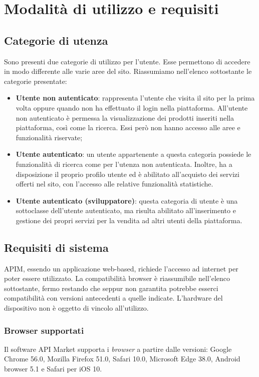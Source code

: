 \newpage
\section{Modalità di utilizzo e requisiti}

\subsection{Categorie di utenza}
Sono presenti due categorie di utilizzo per l'utente. Esse permettono di accedere in modo differente alle varie aree del sito. Riassumiamo nell'elenco sottostante le categorie presentate:

\begin{itemize}
	\item \textbf{Utente non autenticato}: rappresenta l'utente che visita il sito per la prima volta oppure quando non ha effettuato il login nella piattaforma. All'utente non autenticato è permessa la visualizzazione dei prodotti inseriti nella piattaforma, così come la ricerca. Essi però non hanno accesso alle aree e funzionalità riservate;
	\item \textbf{Utente autenticato}: un utente appartenente a questa categoria possiede le funzionalità di ricerca come per l'utenza non autenticata. Inoltre, ha a disposizione il proprio profilo utente ed è abilitato all'acquisto dei servizi offerti nel sito, con l'accesso alle relative funzionalità statistiche.
	\item \textbf{Utente autenticato (sviluppatore)}: questa categoria di utente è una sottoclasse dell'utente autenticato, ma risulta abilitato all'inserimento e gestione dei propri servizi per la vendita ad altri utenti della piattaforma. 
\end{itemize}

\subsection{Requisiti di sistema}
APIM, essendo un applicazione web-based, richiede l'accesso ad internet per poter essere utilizzato. La compatibilità browser è riassumibile nell'elenco sottostante, fermo restando che seppur non garantita potrebbe esserci compatibilità con versioni antecedenti a quelle indicate. L'hardware del dispositivo non è oggetto di vincolo all'utilizzo.

\subsubsection{Browser supportati}
Il software API Market supporta i \textit{browser} a partire dalle versioni: Google Chrome 56.0, Mozilla Firefox 51.0, Safari 10.0, Microsoft Edge 38.0, Android browser 5.1 e Safari per iOS 10.
